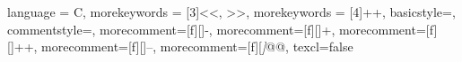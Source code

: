  {
    language = C,
    morekeywords = [3]{<<, >>},
    morekeywords = [4]{++},
    basicstyle=\ttfamily\scriptsize,
    commentstyle=\color{blue}\ttfamily,
    morecomment=[f][]-,
    morecomment=[f][]+,
    morecomment=[f][]++,
    morecomment=[f][]--,
    morecomment=[f][\textit]{@@},
    texcl=false
}


\newcommand{\sys}{\textsc{DarkLordSauron}\xspace}
\newcommand{\ttt}[1]{\texttt{#1}\xspace}
\newcommand{\rev}[1]{#1}
\newcommand\SystemName{\sys}
\newcommand\FIXME[1]{{\color{red}#1}\xspace}
\newcommand\cparagraph[1]{\vspace{1.2mm}\noindent \textbf{#1.}}

